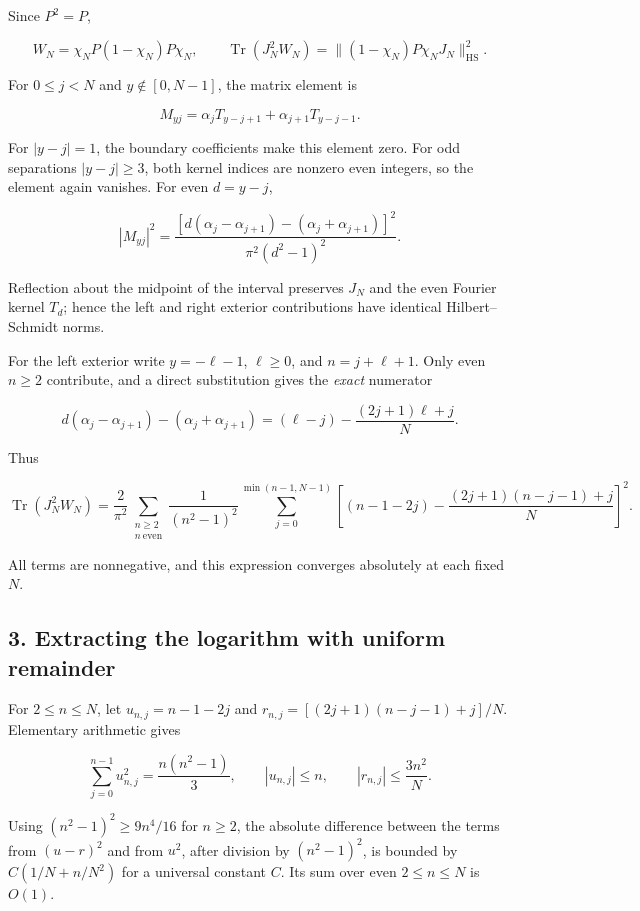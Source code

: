 \documentclass[
  10pt,
  a4paper,
]{article}
\begin{document}
Since \(P^2=P\),

\[
 W_N=\chi_NP(1-\chi_N)P\chi_N,\qquad
 \operatorname{Tr}(J_N^2W_N)=\|(1-\chi_N)P\chi_NJ_N\|_{\mathrm{HS}}^2.
\]

For \(0\le j<N\) and \(y\notin[0,N-1]\), the matrix element is

\[
 M_{yj}=\alpha_jT_{y-j+1}+\alpha_{j+1}T_{y-j-1}.
\]

For \(|y-j|=1\), the boundary coefficients make this element zero. For odd separations \(|y-j|\ge3\), both kernel indices are nonzero even integers, so the element again vanishes. For even \(d=y-j\),

\[
 |M_{yj}|^2=\frac{[d(\alpha_j-\alpha_{j+1})-(\alpha_j+\alpha_{j+1})]^2}{\pi^2(d^2-1)^2}.
\]

Reflection about the midpoint of the interval preserves \(J_N\) and the even Fourier kernel \(T_d\); hence the left and right exterior contributions have identical Hilbert--Schmidt norms.

For the left exterior write \(y=-\ell-1\), \(\ell\ge0\), and \(n=j+\ell+1\). Only even \(n\ge2\) contribute, and a direct substitution gives the \emph{exact} numerator

\[
 d(\alpha_j-\alpha_{j+1})-(\alpha_j+\alpha_{j+1})
 = (\ell-j)-\frac{(2j+1)\ell+j}{N}.
\tag{1}
\]

Thus

\[
\operatorname{Tr}(J_N^2W_N)=\frac{2}{\pi^2}
\sum_{\substack{n\ge2\\n\ \mathrm{even}}}
\frac{1}{(n^2-1)^2}
\sum_{j=0}^{\min(n-1,N-1)}
\left[(n-1-2j)-\frac{(2j+1)(n-j-1)+j}{N}\right]^2.
\tag{2}
\]

All terms are nonnegative, and this expression converges absolutely at each fixed \(N\).

\subsection{3. Extracting the logarithm with uniform remainder}\label{extracting-the-logarithm-with-uniform-remainder}

For \(2\le n\le N\), let \(u_{n,j}=n-1-2j\) and \(r_{n,j}=[(2j+1)(n-j-1)+j]/N\). Elementary arithmetic gives

\[
\sum_{j=0}^{n-1}u_{n,j}^2=\frac{n(n^2-1)}3,
\qquad |u_{n,j}|\le n,\qquad |r_{n,j}|\le\frac{3n^2}{N}.
\]

Using \((n^2-1)^2\ge 9n^4/16\) for \(n\ge2\), the absolute difference between the terms from \((u-r)^2\) and from \(u^2\), after division by \((n^2-1)^2\), is bounded by \(C(1/N+n/N^2)\) for a universal constant \(C\). Its sum over even \(2\le n\le N\) is \(O(1)\).
\end{document}
